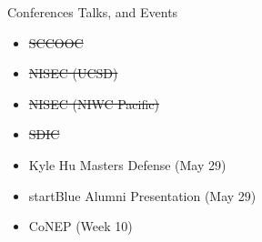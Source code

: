 \begin{frame}{Conferences Talks, and Events}
    \begin{itemize}
        \item \sout{SCCOOC}
        \item \sout{NISEC (UCSD)}
        \item \sout{NISEC (NIWC Pacific)}
        \item \sout{SDIC}
        \item Kyle Hu Masters Defense (May 29)
        \item startBlue Alumni Presentation (May 29)
        \item CoNEP (Week 10)
    \end{itemize}
\end{frame}
